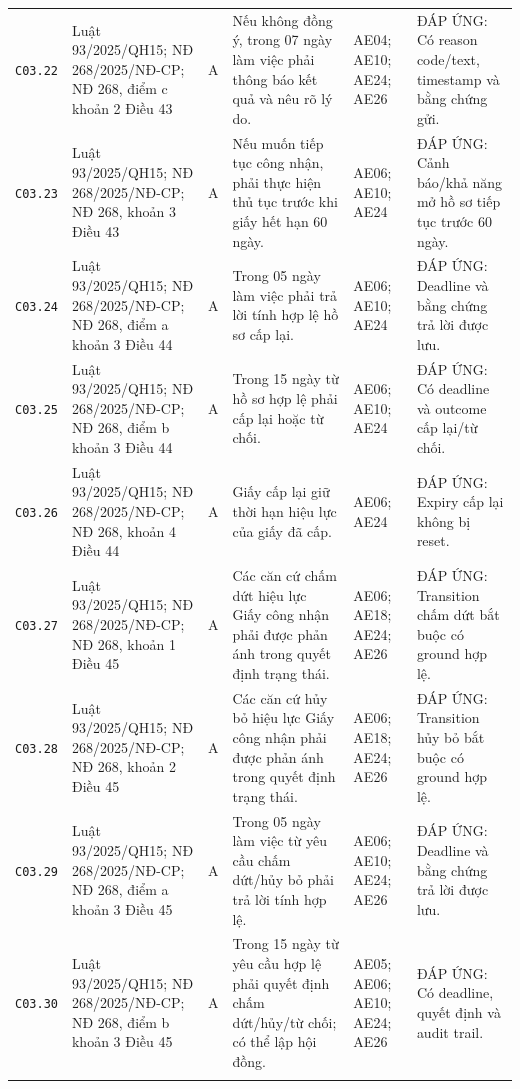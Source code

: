 \begin{longtable}{@{}p{0.9cm}p{3.0cm}p{0.55cm}p{4.05cm}p{2.0cm}p{3.45cm}@{}}
\texttt{C03.22} & Luật 93/2025/QH15; NĐ 268/2025/NĐ-CP; NĐ 268, điểm c khoản 2 Điều 43 & A & Nếu không đồng ý, trong 07 ngày làm việc phải thông báo kết quả và nêu rõ lý do. & AE04; AE10; AE24; AE26 & ĐÁP ỨNG: Có reason code/text, timestamp và bằng chứng gửi. \\ \addlinespace[1pt]
\texttt{C03.23} & Luật 93/2025/QH15; NĐ 268/2025/NĐ-CP; NĐ 268, khoản 3 Điều 43 & A & Nếu muốn tiếp tục công nhận, phải thực hiện thủ tục trước khi giấy hết hạn 60 ngày. & AE06; AE10; AE24 & ĐÁP ỨNG: Cảnh báo/khả năng mở hồ sơ tiếp tục trước 60 ngày. \\ \addlinespace[1pt]
\texttt{C03.24} & Luật 93/2025/QH15; NĐ 268/2025/NĐ-CP; NĐ 268, điểm a khoản 3 Điều 44 & A & Trong 05 ngày làm việc phải trả lời tính hợp lệ hồ sơ cấp lại. & AE06; AE10; AE24 & ĐÁP ỨNG: Deadline và bằng chứng trả lời được lưu. \\ \addlinespace[1pt]
\texttt{C03.25} & Luật 93/2025/QH15; NĐ 268/2025/NĐ-CP; NĐ 268, điểm b khoản 3 Điều 44 & A & Trong 15 ngày từ hồ sơ hợp lệ phải cấp lại hoặc từ chối. & AE06; AE10; AE24 & ĐÁP ỨNG: Có deadline và outcome cấp lại/từ chối. \\ \addlinespace[1pt]
\texttt{C03.26} & Luật 93/2025/QH15; NĐ 268/2025/NĐ-CP; NĐ 268, khoản 4 Điều 44 & A & Giấy cấp lại giữ thời hạn hiệu lực của giấy đã cấp. & AE06; AE24 & ĐÁP ỨNG: Expiry cấp lại không bị reset. \\ \addlinespace[1pt]
\texttt{C03.27} & Luật 93/2025/QH15; NĐ 268/2025/NĐ-CP; NĐ 268, khoản 1 Điều 45 & A & Các căn cứ chấm dứt hiệu lực Giấy công nhận phải được phản ánh trong quyết định trạng thái. & AE06; AE18; AE24; AE26 & ĐÁP ỨNG: Transition chấm dứt bắt buộc có ground hợp lệ. \\ \addlinespace[1pt]
\texttt{C03.28} & Luật 93/2025/QH15; NĐ 268/2025/NĐ-CP; NĐ 268, khoản 2 Điều 45 & A & Các căn cứ hủy bỏ hiệu lực Giấy công nhận phải được phản ánh trong quyết định trạng thái. & AE06; AE18; AE24; AE26 & ĐÁP ỨNG: Transition hủy bỏ bắt buộc có ground hợp lệ. \\ \addlinespace[1pt]
\texttt{C03.29} & Luật 93/2025/QH15; NĐ 268/2025/NĐ-CP; NĐ 268, điểm a khoản 3 Điều 45 & A & Trong 05 ngày làm việc từ yêu cầu chấm dứt/hủy bỏ phải trả lời tính hợp lệ. & AE06; AE10; AE24; AE26 & ĐÁP ỨNG: Deadline và bằng chứng trả lời được lưu. \\ \addlinespace[1pt]
\texttt{C03.30} & Luật 93/2025/QH15; NĐ 268/2025/NĐ-CP; NĐ 268, điểm b khoản 3 Điều 45 & A & Trong 15 ngày từ yêu cầu hợp lệ phải quyết định chấm dứt/hủy/từ chối; có thể lập hội đồng. & AE05; AE06; AE10; AE24; AE26 & ĐÁP ỨNG: Có deadline, quyết định và audit trail. \\ \addlinespace[1pt]

\end{longtable}
